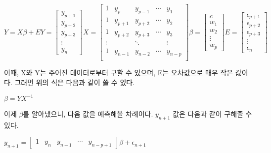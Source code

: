 \documentclass[manuscript,screen,review]{acmart}
\begin{document}
\begin{math}
  Y = X\beta + E
  
  Y = 
  \begin{bmatrix}
  y_{p+1} \\ y_{p+2} \\ y_{p+3} \\ \vdots \\ y_{n}
  \end{bmatrix}
  
  X = 
  \begin{bmatrix}
  1 & y_{p} & y_{p-1} & \cdots & y_{1} \\
  1 & y_{p+1} & y_{p+2} & \cdots & y_{2} \\
  1 & y_{p+2} & y_{p+3} & \cdots & y_{3} \\
  \vdots &  & \ddots & & \vdots \\
  1 & y_{n-1} & y_{n-2} & \cdots & y_{n-p} \\
  \end{bmatrix}
  
  \beta = 
  \begin{bmatrix}
  c \\ w_1 \\ w_2 \\ \vdots \\ w_p
  \end{bmatrix}
  
  E = 
  \begin{bmatrix}
  \epsilon_{p+1} \\ \epsilon_{p+2} \\ \epsilon_{p+3} \\ \vdots \\ \epsilon_n
  \end{bmatrix}
\end{math}

이때, X와 Y는 주어진 데이터로부터 구할 수 있으며, E는 오차값으로 매우 작은 값이다. 그러면 위의 식은 다음과 같이 쓸 수 있다.

\begin{math}
  \beta = Y X^{-1}
\end{math}

이제 $\beta$를 알아냈으니, 다음 값을 예측해볼 차례이다. $y_{n+1}$ 값은 다음과 같이 구해줄 수 있다.

\begin{math}
  y_{n+1} = 
  \begin{bmatrix}
  1 & y_{n} & y_{n-1} & \cdots & y_{n-p+1}
  \end{bmatrix}
  \beta + \epsilon_{n+1}
\end{math}
\end{document}
